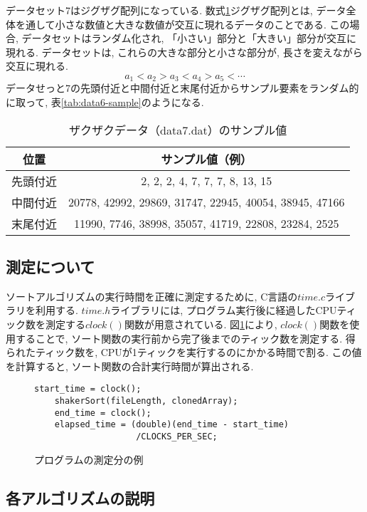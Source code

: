 \documentclass[a4j, 11pt]{jarticle}
\begin{document}
データセット7はジグザグ配列になっている. 数式\ref{tab:data7-sample}ジグザグ配列とは, データ全体を通して小さな数値と大きな数値が交互に現れるデータのことである. この場合, データセットはランダム化され, 「小さい」部分と「大きい」部分が交互に現れる. データセットは, これらの大きな部分と小さな部分が, 長さを変えながら交互に現れる. \\
\begin{equation}\label{zigzagsequence}
  a_1 < a_2 > a_3 < a_4 > a_5 < \cdots
\end{equation}
データせっと7の先頭付近と中間付近と末尾付近からサンプル要素をランダム的に取って, 表\ref{tab:data6-sample}のようになる. 
\begin{table}[H]
  \centering
  \caption{ザクザクデータ（data7.dat）のサンプル値}
  \begin{tabular}{|c|c|}
    \hline
    位置 & サンプル値（例） \\
    \hline
    先頭付近 & 2, 2, 2, 4, 7, 7, 7, 8, 13, 15 \\
    中間付近 & 20778, 42992, 29869, 31747, 22945, 40054, 38945, 47166 \\
    末尾付近 & 11990, 7746, 38998, 35057, 41719, 22808, 23284, 2525\\
    \hline
  \end{tabular}\label{tab:data7-sample}
\end{table}
\subsection{測定について}
ソートアルゴリズムの実行時間を正確に測定するために, C言語の$time.c$ライブラリを利用する. $time.h$ライブラリには, プログラム実行後に経過したCPUティック数を測定する$clock()$関数が用意されている\cite{ibm:clock2024}. 図\ref{fig:clockcode}により, $clock()$関数を使用することで, ソート関数の実行前から完了後までのティック数を測定する. 得られたティック数を, CPUが1ティックを実行するのにかかる時間で割る. この値を計算すると, ソート関数の合計実行時間が算出される. 
\begin{figure}[htbp]
  \centering
  \caption{プログラムの測定分の例}\label{fig:clockcode}
  \begin{lstlisting}[basicstyle=\ttfamily\small]
    start_time = clock();
    shakerSort(fileLength, clonedArray);
    end_time = clock();
    elapsed_time = (double)(end_time - start_time)
                    /CLOCKS_PER_SEC;
  \end{lstlisting}
\end{figure}
\newpage
\subsection{各アルゴリズムの説明}
\end{document}
